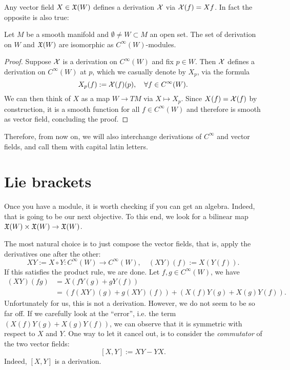 Any vector field $X\in\mathfrak{X}(W)$ defines a derivation $\mathcal{X}$ via $\mathcal{X}(f) = Xf$. In fact the opposite is also true:
\begin{proposition}
  Let $M$ be a smooth manifold and $\emptyset\neq W\subset M$ an open set.
  The set of derivation on $W$ and $\mathfrak{X}(W)$ are isomorphic as $C^\infty(W)$-modules.
\end{proposition}
\begin{proof}
  Suppose $\mathcal{X}$ is a derivation on $C^\infty(W)$ and fix $p\in W$. Then $\mathcal{X}$ defines a derivation on $C^\infty(W)$ at $p$, which we casually denote by $X_p$, via the formula
  \begin{equation}
    X_p(f) := \mathcal{X}(f)(p), \quad\forall f\in C^\infty(W).
  \end{equation}
  We can then think of $X$ as a map $W\to TM$ via $X\mapsto X_p$.
  Since $X(f)=\mathcal{X}(f)$ by construction, it is a smooth function for all $f\in C^\infty(W)$ and therefore is smooth as vector field, concluding the proof.
\end{proof}

Therefore, from now on, we will also interchange derivations of $C^\infty$ and vector fields, and call them with capital latin letters.

\section{Lie brackets}

Once you have a module, it is worth checking if you can get an algebra.
Indeed, that is going to be our next objective.
To this end, we look for a bilinear map $\mathfrak{X}(W)\times\mathfrak{X}(W) \to \mathfrak{X}(W)$.

The most natural choice is to just compose the vector fields, that is, apply the derivatives one after the other:
\begin{equation}
  X Y := X \circ Y : C^\infty(W) \to C^\infty(W), \quad
  (X Y)(f) := X(Y(f)).
\end{equation}
If this satisfies the product rule, we are done.
Let $f,g\in C^\infty(W)$, we have
\begin{align}
  (X Y)(fg) &= X(fY(g) + gY(f)) \\
  &= \left(f(X Y)(g) + g(X Y)(f)\right) + \left( X(f)Y(g) +X(g)Y(f)\right).
\end{align}
Unfortunately for us, this is not a derivation. However, we do not seem to be so far off.
If we carefully look at the ``error'', i.e. the term $\left( X(f)Y(g) +X(g)Y(f)\right)$, we can observe that it is symmetric with respect to $X$ and $Y$.
One way to let it cancel out, is to consider the \emph{commutator} of the two vector fields:
\begin{equation}\label{def:commutator}
    [X,Y] := X Y - Y X.
\end{equation}
Indeed, $[X,Y]$ is a derivation.

